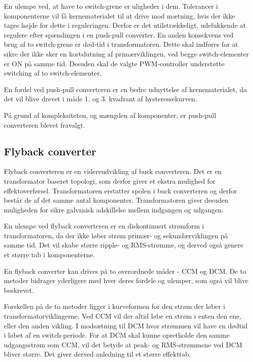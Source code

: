 En ulempe ved, at have to switch-grene er uligheder i dem. Tolerancer i komponenterne vil få kernematerialet til at drive mod mætning, hvis der ikke tages højde for dette i reguleringen. Derfor er det utilstrækkeligt, udelukkende at regulere efter spændingen i en push-pull converter. En anden konsekvens ved brug af to switch-grene er død-tid i transformatoren. Dette skal indføres for at sikre der ikke sker en kortslutning af primærviklingen, ved begge switch-elementer er ON på samme tid. Desuden skal de valgte PWM-controller understøtte switching af to switch-elementer. 

En fordel ved push-pull converteren er en bedre udnyttelse af kernematerialet, da det vil blive drevet i måde 1. og 3. kvadrant af hysteressekurven. 

På grund af kompleksiteten, og mængden af komponenter, er push-pull converteren blevet fravalgt. 



\subsection{Flyback converter}
Flyback converteren er en videreudvikling af buck converteren. Det er en transformator baseret topologi, som derfor giver et ekstra mulighed for effektoverførsel. Transformatoren erstatter spolen i buck converteren og derfor består de af det samme antal komponenter. Transformatoren giver desuden muligheden for sikre galvanisk adskillelse mellem indgangen og udgangen. 

En ulempe ved flyback converteren er en diskontinuert strømform i transformatoren, da der ikke løber strøm primær- og sekundærviklingen på samme tid. Det vil skabe større ripple- og RMS-strømme, og derved også genere et større tab i komponenterne\cite{SMPS-topologies}. 

En flyback converter kan drives på to overordnede måder - CCM og DCM. De to metoder bidrager yderligere med hver deres fordele og ulemper, som også vil blive beskrevet. 

Forskellen på de to metoder ligger i kurveformen for den strøm der løber i transformatorviklingerne. Ved CCM vil der altid løbe en strøm i enten den ene, eller den anden vikling. I modsætning til DCM hvor strømmen vil have en dødtid i løbet af en switch-periode. For at DCM skal kunne opretholde den samme udgangsstrøm som CCM, vil det betyde at peak- og RMS-strømmene ved DCM bliver større. Det giver derved anledning til et større effekttab. 

